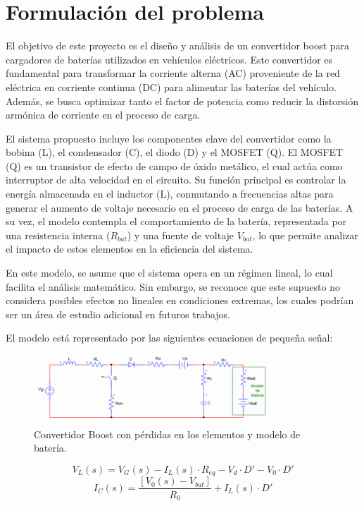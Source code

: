 \section{Formulación del problema}
El objetivo de este proyecto es el diseño y análisis de un convertidor boost para cargadores de baterías
utilizados en vehículos eléctricos. Este convertidor es fundamental para transformar la corriente
alterna (AC) proveniente de la red eléctrica en corriente continua (DC) para alimentar las baterías del
vehículo. Además, se busca optimizar tanto el factor de potencia como reducir la distorsión armónica
de corriente en el proceso de carga.

El sistema propuesto incluye los componentes clave del convertidor como la bobina (L), el
condensador (C), el diodo (D) y el MOSFET (Q). El MOSFET (Q) es un transistor de efecto de
campo de óxido metálico, el cual actúa como interruptor de alta velocidad en el circuito. Su función
principal es controlar la energía almacenada en el inductor (L), conmutando a frecuencias altas para
generar el aumento de voltaje necesario en el proceso de carga de las baterías. A su vez, el modelo
contempla el comportamiento de la batería, representada por una resistencia interna (\(R_{bat}\)) y una
fuente de voltaje \(V_{bat}\), lo que permite analizar el impacto de estos elementos en la eficiencia del
sistema.

En este modelo, se asume que el sistema opera en un régimen lineal, lo cual facilita el análisis
matemático. Sin embargo, se reconoce que este supuesto no considera posibles efectos no lineales en
condiciones extremas, los cuales podrían ser un área de estudio adicional en futuros trabajos.

El modelo está representado por las siguientes ecuaciones de pequeña señal:

\begin{figure}[h]
    \centering
    \includegraphics[width=0.8\textwidth]{1.png} %
    \caption{Convertidor Boost con pérdidas en los elementos y modelo de batería.}
    \label{fig:convertidor}
\end{figure}

\[V_L(s) = V_G(s) - I_L(s) \cdot R_{eq} - V_d \cdot D' - V_0 \cdot D'\]
\[I_C(s) = \frac{[V_0(s) - V_{bat}]}{R_0} + I_L(s) \cdot D'\]

